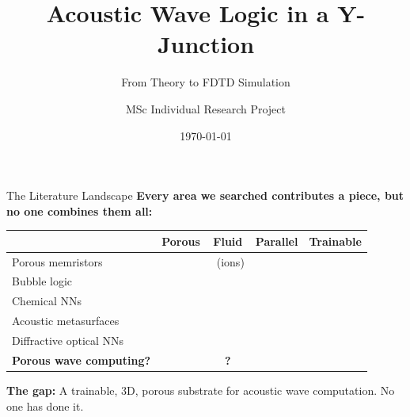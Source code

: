 \documentclass[aspectratio=169,11pt]{beamer}
\title{Acoustic Wave Logic in a Y-Junction}
\subtitle{From Theory to FDTD Simulation}
\author{MSc Individual Research Project}
\institute{Cranfield University\hspace{0.3cm}|\hspace{0.3cm}Supervisors: Prof. Weisi Guo, Prof. Takis Tsoutsanis}
\date{\today}
\newcommand{\cmark}{\ding{51}}
\newcommand{\xmark}{\ding{55}}
\begin{document}
\begin{frame}[plain]
  \titlepage
\end{frame}

\begin{frame}{The Literature Landscape}
  \textbf{Every area we searched contributes a piece, but no one combines them all:}
  \vspace{0.15cm}

  \begin{table}
    \centering
    \footnotesize
    \renewcommand{\arraystretch}{1.05}
    \begin{tabular}{@{}lcccc@{}}
      \toprule
      & \textbf{Porous} & \textbf{Fluid} & \textbf{Parallel} & \textbf{Trainable} \\
      \midrule
      Porous memristors & \cmark & \cmark\ (ions) & \xmark & \xmark \\
      Bubble logic & \xmark & \cmark & \cmark & \xmark \\
      Chemical NNs & \xmark & \cmark & \xmark & \cmark \\
      Acoustic metasurfaces & \xmark & \xmark & \xmark & \xmark \\
      Diffractive optical NNs & \xmark & \xmark & \cmark & \cmark \\
      \midrule
      \textbf{Porous wave computing?} & \textbf{\cmark} & \textbf{?} & \textbf{\cmark} & \textbf{\cmark} \\
      \bottomrule
    \end{tabular}
  \end{table}

  \vspace{0.1cm}
  {\small \textbf{The gap:} A trainable, 3D, porous substrate for acoustic wave computation. No one has done it.}
\end{frame}
\end{document}
